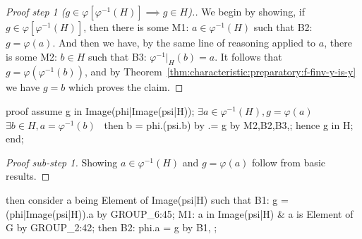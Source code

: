 \begin{proof}[{Proof step 1 ($g\in\varphi[\varphi^{-1}(H)]\implies g\in H$)}.]
We begin by showing, if $g\in\varphi[\varphi^{-1}(H)]$, then there is
some {\Tt{}M1:\nwendquote} $a\in\varphi^{-1}(H)$ such that {\Tt{}B2:\nwendquote} $g=\varphi(a)$. And
then we have, by the same line of reasoning applied to $a$, there is
some {\Tt{}M2:\nwendquote} $b\in H$ such that {\Tt{}B3:\nwendquote} $\varphi^{-1}|_{H}(b)=a$. It
follows that $g = \varphi(\varphi^{-1}(b))$, and by Theorem~\ref{thm:characteristic:preparatory:f-finv-y-is-y} we have
$g = b$ which proves the claim.
\end{proof}

\nwenddocs{}\endmoddef\nwstartdeflinemarkup{}\nwenddeflinemarkup
proof
  assume g in Image(phi|Image(psi|H));
  \LA{}$\exists a\in\varphi^{-1}(H),g=\varphi(a)$~{\nwtagstyle{}}\RA{}
  \LA{}$\exists b\in H, a = \varphi^{-1}(b)$~{\nwtagstyle{}}\RA{}
  then b = phi.(psi.b) by 
        .= g by M2,B2,B3,;
  hence g in H;
end;
\nwendcode{}\nwdocspar

\begin{proof}[Proof sub-step 1]
Showing $a\in\varphi^{-1}(H)$ and $g=\varphi(a)$ follow from basic results.
\end{proof}

\nwenddocs{}\endmoddef\nwstartdeflinemarkup{}\nwenddeflinemarkup
then consider a being Element of Image(psi|H) such that
B1: g = (phi|Image(psi|H)).a by GROUP_6:45;
M1: a in Image(psi|H) & a is Element of G by GROUP_2:42;
then B2: phi.a = g by B1, ;
\nwendcode{}\nwdocspar

